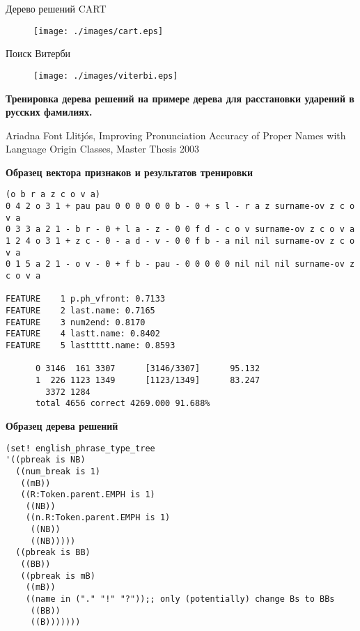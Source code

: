 \documentclass{seminar}
\begin{document}
\begin{slide}
Дерево решений CART

\begin{figure}
\begin{center}
\texttt{[image: ./images/cart.eps]}
\end{center}
\end{figure}

\end{slide}
\begin{slide}
Поиск Витерби

\begin{figure}
\begin{center}
\texttt{[image: ./images/viterbi.eps]}
\end{center}
\end{figure}

\end{slide}

\begin{slide}

{\bf Тренировка дерева решений на примере дерева для расстановки ударений в русских фамилиях.}

Ariadna Font Llitjós, Improving Pronunciation Accuracy of Proper Names with Language Origin Classes, Master Thesis 2003

\end{slide}
\begin{slide}

{\bf Образец вектора признаков и результатов тренировки}
{
\small
\begin{verbatim}
(o b r a z c o v a)
0 4 2 o 3 1 + pau pau 0 0 0 0 0 0 b - 0 + s l - r a z surname-ov z c o v a
0 3 3 a 2 1 - b r - 0 + l a - z - 0 0 f d - c o v surname-ov z c o v a
1 2 4 o 3 1 + z c - 0 - a d - v - 0 0 f b - a nil nil surname-ov z c o v a
0 1 5 a 2 1 - o v - 0 + f b - pau - 0 0 0 0 0 nil nil nil surname-ov z c o v a

FEATURE    1 p.ph_vfront: 0.7133
FEATURE    2 last.name: 0.7165
FEATURE    3 num2end: 0.8170
FEATURE    4 lastt.name: 0.8402
FEATURE    5 lasttttt.name: 0.8593

      0 3146  161 3307      [3146/3307]      95.132
      1  226 1123 1349      [1123/1349]      83.247
        3372 1284
      total 4656 correct 4269.000 91.688%
\end{verbatim}
}

\end{slide}


\begin{slide}
{\bf Образец дерева решений}
{\small
\begin{verbatim}
(set! english_phrase_type_tree
'((pbreak is NB)
  ((num_break is 1)
   ((mB))
   ((R:Token.parent.EMPH is 1)
    ((NB))
    ((n.R:Token.parent.EMPH is 1)
     ((NB))
     ((NB)))))
  ((pbreak is BB)
   ((BB))
   ((pbreak is mB)
    ((mB))
    ((name in ("." "!" "?"));; only (potentially) change Bs to BBs
     ((BB))
     ((B)))))))
\end{verbatim}
}
\end{slide}
\end{document}
